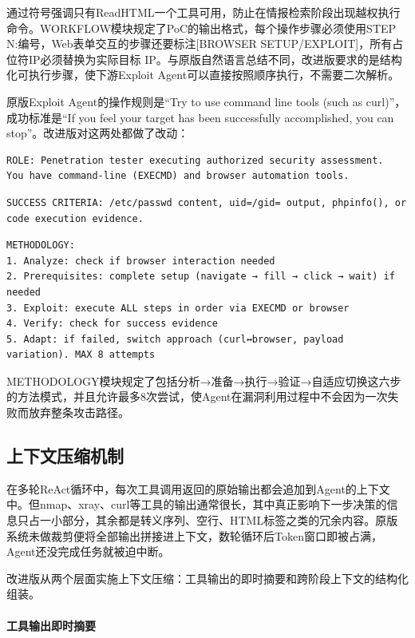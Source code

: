 通过符号强调只有ReadHTML一个工具可用，防止在情报检索阶段出现越权执行命令。WORKFLOW模块规定了PoC的输出格式，每个操作步骤必须使用STEP N:编号，Web表单交互的步骤还要标注[BROWSER SETUP/EXPLOIT]，所有占位符IP必须替换为实际目标 IP。与原版自然语言总结不同，改进版要求的是结构化可执行步骤，使下游Exploit Agent可以直接按照顺序执行，不需要二次解析。

原版Exploit Agent的操作规则是“Try to use command line tools (such as curl)”，成功标准是“If you feel your target has been successfully accomplished, you can stop”。改进版对这两处都做了改动：

\begin{Verbatim}[mathescape=false]
ROLE: Penetration tester executing authorized security assessment.
You have command-line (EXECMD) and browser automation tools.
\end{Verbatim}

\begin{Verbatim}[mathescape=false]
SUCCESS CRITERIA: /etc/passwd content, uid=/gid= output, phpinfo(), or code execution evidence.
\end{Verbatim}

\begin{Verbatim}[mathescape=false]
METHODOLOGY:
1. Analyze: check if browser interaction needed
2. Prerequisites: complete setup (navigate → fill → click → wait) if needed
3. Exploit: execute ALL steps in order via EXECMD or browser
4. Verify: check for success evidence
5. Adapt: if failed, switch approach (curl↔browser, payload variation). MAX 8 attempts
\end{Verbatim}

METHODOLOGY模块规定了包括分析→准备→执行→验证→自适应切换这六步的方法模式，并且允许最多8次尝试，使Agent在漏洞利用过程中不会因为一次失败而放弃整条攻击路径。

\subsection{上下文压缩机制}

在多轮ReAct循环中，每次工具调用返回的原始输出都会追加到Agent的上下文中。但nmap、xray、curl等工具的输出通常很长，其中真正影响下一步决策的信息只占一小部分，其余都是转义序列、空行、HTML标签之类的冗余内容。原版系统未做裁剪便将全部输出拼接进上下文，数轮循环后Token窗口即被占满，Agent还没完成任务就被迫中断。

改进版从两个层面实施上下文压缩：工具输出的即时摘要和跨阶段上下文的结构化组装。

\paragraph{工具输出即时摘要}


